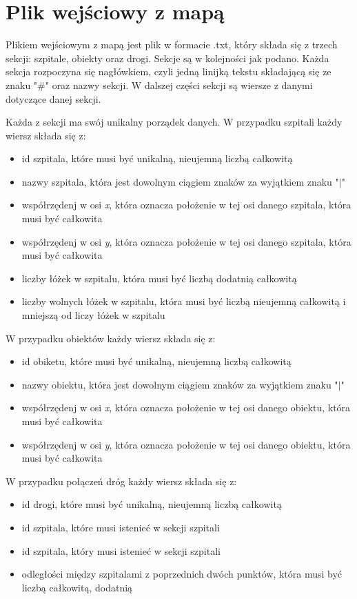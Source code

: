 \documentclass[10pt,a4paper]{article}
\begin{document}
\section{Plik wejściowy z mapą}

Plikiem wejściowym z mapą jest plik w formacie .txt, który składa się z trzech sekcji: szpitale, obiekty oraz drogi. Sekcje są w kolejności jak podano. Każda sekcja rozpoczyna się nagłówkiem, czyli jedną linijką tekstu składającą się ze znaku "\#" oraz nazwy sekcji. W dalszej części sekcji są wiersze z danymi dotyczące danej sekcji.

Każda z sekcji ma swój unikalny porządek danych. W przypadku szpitali każdy wiersz składa się z:
\begin{itemize}
\item id szpitala, które musi być unikalną, nieujemną liczbą całkowitą
\item nazwy szpitala, która jest dowolnym ciągiem znaków za wyjątkiem znaku "$\mid$"
\item współrzędenj w osi \textit{x}, która oznacza położenie w tej osi danego szpitala, która musi być całkowita
\item współrzędenj w osi \textit{y}, która oznacza położenie w tej osi danego szpitala, która musi być całkowita
\item liczby łóżek w szpitalu, która musi być liczbą dodatnią całkowitą
\item liczby wolnych łóżek w szpitalu, która musi być liczbą nieujemną całkowitą i mniejszą od liczy łóżek w szpitalu
\end{itemize}
W przypadku obiektów każdy wiersz składa się z:
\begin{itemize}
\item id obiketu, które musi być unikalną, nieujemną liczbą całkowitą
\item nazwy obiektu, która jest dowolnym ciągiem znaków za wyjątkiem znaku "$\mid$"
\item współrzędenj w osi \textit{x}, która oznacza położenie w tej osi danego obiektu, która musi być całkowita
\item współrzędenj w osi \textit{y}, która oznacza położenie w tej osi danego obiektu, która musi być całkowita
\end{itemize}
W przypadku połączeń dróg każdy wiersz składa się z:
\begin{itemize}
\item id drogi, które musi być unikalną, nieujemną liczbą całkowitą
\item id szpitala, które musi istenieć w sekcji szpitali
\item id szpitala, który musi istenieć w sekcji szpitali
\item odległości między szpitalami z poprzednich dwóch punktów, która musi być liczbą całkowitą, dodatnią
\end{itemize}
\end{document}
